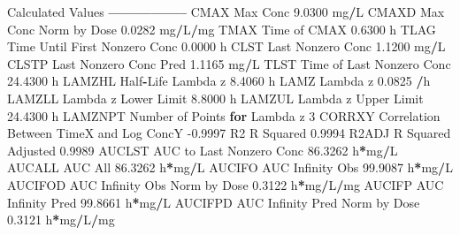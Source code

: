 \documentclass[12pt,]{krantz}
\newenvironment{Shaded}{\begin{snugshade}}{\end{snugshade}}
\newcommand{\ControlFlowTok}[1]{\textcolor[rgb]{0.13,0.29,0.53}{\textbf{#1}}}
\newcommand{\DecValTok}[1]{\textcolor[rgb]{0.00,0.00,0.81}{#1}}
\newcommand{\FloatTok}[1]{\textcolor[rgb]{0.00,0.00,0.81}{#1}}
\newcommand{\NormalTok}[1]{#1}
\newcommand{\OperatorTok}[1]{\textcolor[rgb]{0.81,0.36,0.00}{\textbf{#1}}}
\begin{document}
\begin{Shaded}
\begin{Highlighting}[]
{{{{{{{{{{{{{{{{{{{{{{{{{{{{\NormalTok{Calculated Values}
\OperatorTok{-----------------}
\NormalTok{CMAX       Max Conc                                        }\FloatTok{9.0300}\NormalTok{ mg}\OperatorTok{/}\NormalTok{L}
\NormalTok{CMAXD      Max Conc Norm by Dose                           }\FloatTok{0.0282}\NormalTok{ mg}\OperatorTok{/}\NormalTok{L}\OperatorTok{/}\NormalTok{mg}
\NormalTok{TMAX       Time of CMAX                                    }\FloatTok{0.6300}\NormalTok{ h}
\NormalTok{TLAG       Time Until First Nonzero Conc                   }\FloatTok{0.0000}\NormalTok{ h}
\NormalTok{CLST       Last Nonzero Conc                               }\FloatTok{1.1200}\NormalTok{ mg}\OperatorTok{/}\NormalTok{L}
\NormalTok{CLSTP      Last Nonzero Conc Pred                          }\FloatTok{1.1165}\NormalTok{ mg}\OperatorTok{/}\NormalTok{L}
\NormalTok{TLST       Time of Last Nonzero Conc                      }\FloatTok{24.4300}\NormalTok{ h}
\NormalTok{LAMZHL     Half}\OperatorTok{-}\NormalTok{Life Lambda z                              }\FloatTok{8.4060}\NormalTok{ h}
\NormalTok{LAMZ       Lambda z                                        }\FloatTok{0.0825} \OperatorTok{/}\NormalTok{h}
\NormalTok{LAMZLL     Lambda z Lower Limit                            }\FloatTok{8.8000}\NormalTok{ h}
\NormalTok{LAMZUL     Lambda z Upper Limit                           }\FloatTok{24.4300}\NormalTok{ h}
\NormalTok{LAMZNPT    Number of Points }\ControlFlowTok{for}\NormalTok{ Lambda z                   }\DecValTok{3}
\NormalTok{CORRXY     Correlation Between TimeX and Log ConcY        }\FloatTok{-0.9997} 
\NormalTok{R2         R Squared                                       }\FloatTok{0.9994} 
\NormalTok{R2ADJ      R Squared Adjusted                              }\FloatTok{0.9989} 
\NormalTok{AUCLST     AUC to Last Nonzero Conc                       }\FloatTok{86.3262}\NormalTok{ h}\OperatorTok{*}\NormalTok{mg}\OperatorTok{/}\NormalTok{L}
\NormalTok{AUCALL     AUC All                                        }\FloatTok{86.3262}\NormalTok{ h}\OperatorTok{*}\NormalTok{mg}\OperatorTok{/}\NormalTok{L}
\NormalTok{AUCIFO     AUC Infinity Obs                               }\FloatTok{99.9087}\NormalTok{ h}\OperatorTok{*}\NormalTok{mg}\OperatorTok{/}\NormalTok{L}
\NormalTok{AUCIFOD    AUC Infinity Obs Norm by Dose                   }\FloatTok{0.3122}\NormalTok{ h}\OperatorTok{*}\NormalTok{mg}\OperatorTok{/}\NormalTok{L}\OperatorTok{/}\NormalTok{mg}
\NormalTok{AUCIFP     AUC Infinity Pred                              }\FloatTok{99.8661}\NormalTok{ h}\OperatorTok{*}\NormalTok{mg}\OperatorTok{/}\NormalTok{L}
\NormalTok{AUCIFPD    AUC Infinity Pred Norm by Dose                  }\FloatTok{0.3121}\NormalTok{ h}\OperatorTok{*}\NormalTok{mg}\OperatorTok{/}\NormalTok{L}\OperatorTok{/}\NormalTok{mg}
}}}}}}}}}}}}}}}}}}}}}}}}}}}}
\end{Highlighting}
\end{Shaded}
\end{document}
